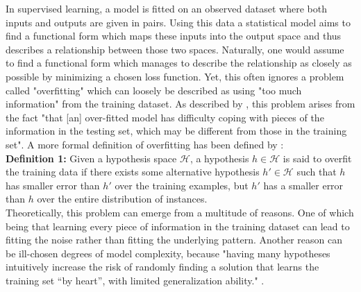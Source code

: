 \documentclass[12pt,a4paper]{article}
\begin{document}
In supervised learning, a model is fitted on an observed dataset where both inputs and outputs are given in pairs. Using this data a statistical model aims to find a functional form which maps these inputs into the output space and thus describes a relationship between those two spaces. Naturally, one would assume to find a functional form which manages to describe the relationship as closely as possible by minimizing a chosen loss function. Yet, this often ignores a problem called "overfitting" which can loosely be described as using "too much information" from the training dataset. As described by \textcite{Ying2019}, this problem arises from the fact "that [an] over-fitted model has difficulty coping with pieces of the information in the testing set, which may be different from those in the training set". A more formal definition of overfitting has been defined by \textcite{Mitchell1997}:\\

\textbf{Definition 1:} Given a hypothesis space $\mathcal{H}$, a hypothesis $h \in \mathcal{H}$ is said to overfit the training data if there exists some alternative hypothesis $h' \in \mathcal{H}$ such that $h$ has smaller error than $h'$ over the training examples, but $h'$ has a smaller error than $h$ over the entire distribution of instances.\\

Theoretically, this problem can emerge from a multitude of reasons. One of which being that learning every piece of information in the training dataset can lead to fitting the noise rather than fitting the underlying pattern. Another reason can be ill-chosen degrees of model complexity, because "having many hypotheses intuitively increase the risk of randomly finding a solution that learns the training set “by heart”, with limited generalization ability." \parencite{ParisRobilliardFonlupt2003}.\\  
\end{document}
